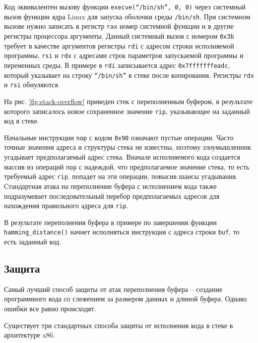 Код эквивалентен вызову функции \texttt{execve(``/bin/sh'', 0, 0)} через системный вызов функции ядра Linux для запуска оболочки среды \texttt{/bin/sh}. При системном вызове нужно записать в регистр \texttt{rax} номер системной функции и в другие регистры процессора аргументы. Данный системный вызов с номером \texttt{0x3b} требует в качестве аргументов регистры \texttt{rdi} с адресом строки исполняемой программы, \texttt{rsi} и \texttt{rdx} с адресами строк параметров запускаемой программы и переменных среды. В примере в \texttt{rdi} записывается адрес \texttt{0x7fffffffeadc}, который указывает на строку \texttt{``/bin/sh''} в стеке после копирования. Регистры \texttt{rdx} и \texttt{rsi} обнуляются.

На рис. \ref{fig:stack-overflow} приведен стек с переполненным буфером, в результате которого записалось новое сохраненное значение \texttt{rip}, указывающее на заданный код в стеке.

Начальные инструкции \texttt{nop} с кодом \texttt{0x90} означают пустые операции. Часто точные значения адреса и структуры стека не известны, поэтому злоумышленник угадывает предполагаемый адрес стека. Вначале исполняемого кода создается массив из операций \texttt{nop} с надеждой, что предполагаемое значение стека, то есть требуемый адрес \texttt{rip}, попадет на эти операции, повысив шансы угадывания. Стандартная атака на переполнение буфера с исполнением кода также подразумевает последовательный перебор предполагаемых адресов для нахождения правильного адреса для \texttt{rip}.

В результате переполнения буфера в примере по завершении функции \texttt{hamming\_distance()} начнет исполняться инструкция с адреса строки \texttt{buf}, то есть заданный код.


\subsection{Защита}

Самый лучший способ защиты от атак переполнения буфера -- создание программного кода со слежением за размером данных и длиной буфера. Однако ошибки все равно происходят.

Существует три стандартных способа защиты от исполнения кода в стеке в архитектуре x86.


